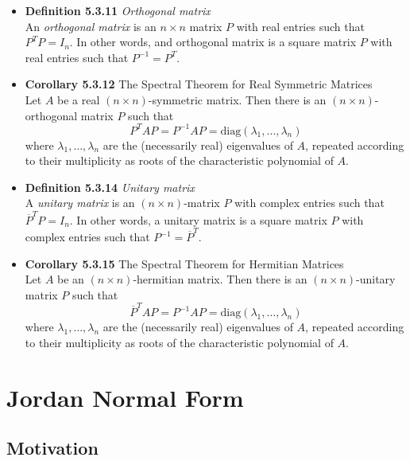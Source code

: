 \documentclass[11pt,a4paper]{article}
\begin{document}
\begin{itemize}
    \item \textbf{Definition 5.3.11} \emph{Orthogonal matrix} \\
        An \emph{orthogonal matrix} is an $n \times n$ matrix $P$ with real entries
        such that $P^T P = I_n$.
        In other words, and orthogonal matrix is a square matrix $P$ with real entries such
        that $P^{-1} = P^T$.

    \item \textbf{Corollary 5.3.12} The Spectral Theorem for Real Symmetric Matrices \\
        Let $A$ be a real $(n \times n)$-symmetric matrix.
        Then there is an $(n \times n)$-orthogonal matrix $P$ such that
        \[
            P^T AP = P^{-1} AP = \mathrm{diag}(\lambda_1, \ldots, \lambda_n)
        \]
        where $\lambda_1, \ldots, \lambda_n$ are the (necessarily real) eigenvalues of $A$,
        repeated according to their multiplicity as roots of the characteristic polynomial of
        $A$.

    \item \textbf{Definition 5.3.14} \emph{Unitary matrix} \\
        A \emph{unitary matrix} is an $(n \times n)$-matrix $P$ with complex entries such that
        $\overline{P}^T P = I_n$.
        In other words, a unitary matrix is a square matrix $P$ with complex entries such that
        $P^{-1} = \overline{P}^T$.

    \item \textbf{Corollary 5.3.15} The Spectral Theorem for Hermitian Matrices \\
        Let $A$ be an $(n \times n)$-hermitian matrix.
        Then there is an $(n \times n)$-unitary matrix $P$ such that
        \[
            \overline{P}^T AP = P^{-1} AP = \mathrm{diag}(\lambda_1, \ldots, \lambda_n)
        \]
        where $\lambda_1, \ldots, \lambda_n$ are the (necessarily real) eigenvalues of $A$,
        repeated according to their multiplicity as roots of the characteristic polynomial of
        $A$.

\end{itemize}

\break{}

\section{Jordan Normal Form}

\subsection{Motivation}
\end{document}
